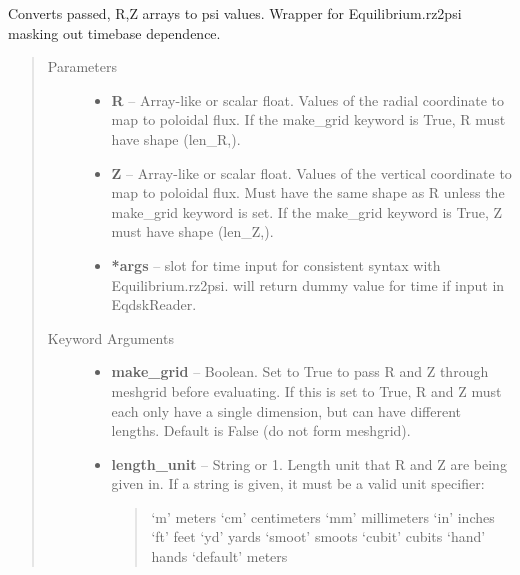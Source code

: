 \documentclass[letterpaper,10pt,english]{sphinxmanual}
\begin{document}
\begin{fulllineitems}
\begin{fulllineitems}
\begin{quote}
\begin{description}
\end{description}\end{quote}

\end{fulllineitems}


\begin{fulllineitems}
\label{eqtools:eqtools.eqdskreader.EqdskReader.rz2psi}
Converts passed, R,Z arrays to psi values.
Wrapper for Equilibrium.rz2psi masking out timebase dependence.
\begin{quote}\begin{description}
\item[{Parameters }] \leavevmode\begin{itemize}
\item {} 
\textbf{R} --
Array-like or scalar float. Values of the radial coordinate to
map to poloidal flux. If the make\_grid keyword is True, R must
have shape (len\_R,).

\item {} 
\textbf{Z} --
Array-like or scalar float. Values of the vertical coordinate to
map to poloidal flux. Must have the same shape as R unless the
make\_grid keyword is set. If the make\_grid keyword is True, Z
must have shape (len\_Z,).

\item {} 
\textbf{*args} --
slot for time input for consistent syntax with Equilibrium.rz2psi.
will return dummy value for time if input in EqdskReader.

\end{itemize}

\item[{Keyword Arguments}] \leavevmode\begin{itemize}
\item {} 
\textbf{make\_grid} --
Boolean. Set to True to pass R and Z through meshgrid
before evaluating. If this is set to True, R and Z must each
only have a single dimension, but can have different lengths.
Default is False (do not form meshgrid).

\item {} 
\textbf{length\_unit} --
String or 1. Length unit that R and Z are being given
in. If a string is given, it must be a valid unit specifier:
\begin{quote}

`m'         meters
`cm'        centimeters
`mm'        millimeters
`in'        inches
`ft'        feet
`yd'        yards
`smoot'     smoots
`cubit'     cubits
`hand'      hands
`default'   meters
\end{quote}


\end{itemize}
\end{description}
\end{quote}
\end{fulllineitems}
\end{fulllineitems}
\end{document}
